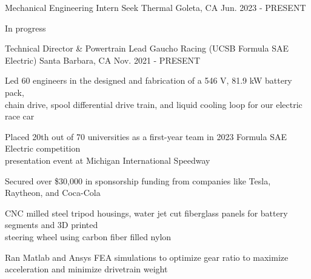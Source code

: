 

\begin{cventries}

\cventry
{Mechanical Engineering Intern} %
{Seek Thermal} %
{Goleta, CA} %
{Jun. 2023 - PRESENT} %
{ %
\begin{cvitems}
\item{In progress}
\end{cvitems}
}

\cventry
{Technical Director \& Powertrain Lead} %
{Gaucho Racing (UCSB Formula SAE Electric)} %
{Santa Barbara, CA} %
{Nov. 2021 - PRESENT} %
{ %
\begin{cvitems}   
\item {Led 60 engineers in the designed and fabrication of a 546 V, 81.9 kW battery pack, \\ chain drive, spool differential drive train, and liquid cooling loop for our electric race car}
\item {Placed 20th out of 70 universities as a first-year team in 2023 Formula SAE Electric competition\\ presentation event at Michigan International Speedway}
\item {Secured over \$30,000 in sponsorship funding from companies like Tesla, Raytheon, and Coca-Cola}
\item {CNC milled steel tripod housings, water jet cut fiberglass panels for battery segments and 3D printed \\ steering wheel using carbon fiber filled nylon}
\item {Ran Matlab and Ansys FEA simulations to optimize gear ratio to maximize acceleration and minimize drivetrain weight}
\end{cvitems}
}



\end{cventries}
